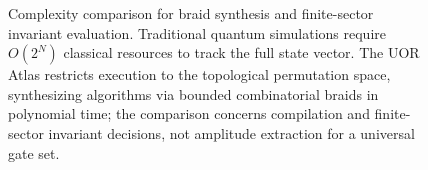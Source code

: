 \begin{figure}[h]
\centering
{}
\caption{Complexity comparison for braid synthesis and finite-sector invariant evaluation. Traditional quantum simulations require $O(2^N)$ classical resources to track the full state vector. The UOR Atlas restricts execution to the topological permutation space, synthesizing algorithms via bounded combinatorial braids in polynomial time; the comparison concerns compilation and finite-sector invariant decisions, not amplitude extraction for a universal gate set.}
\label{fig:complexity}
\end{figure}
